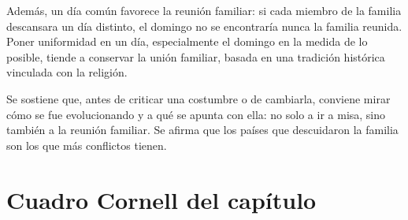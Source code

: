\documentclass[12pt,oneside]{book}
\begin{document}
Además, un día común favorece la reunión familiar: si cada miembro de la familia descansara un día distinto, el domingo no se encontraría nunca la familia reunida. Poner uniformidad en un día, especialmente el domingo en la medida de lo posible, tiende a conservar la unión familiar, basada en una tradición histórica vinculada con la religión.

\begin{note}
Se sostiene que, antes de criticar una costumbre o de cambiarla, conviene mirar cómo se fue evolucionando y a qué se apunta con ella: no solo a ir a misa, sino también a la reunión familiar. Se afirma que los países que descuidaron la familia son los que más conflictos tienen.
\end{note}

\section{Cuadro Cornell del capítulo}
\end{document}
